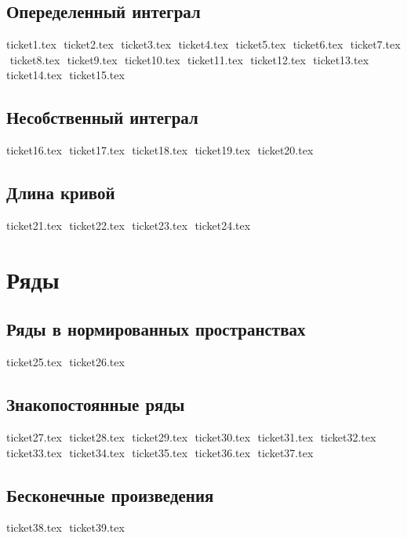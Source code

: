 \section{Опеределенный интеграл}
{ticket1.tex}
$ $
{ticket2.tex}
$ $
{ticket3.tex}
$ $
{ticket4.tex}
$ $
{ticket5.tex}
$ $
{ticket6.tex}
$ $
{ticket7.tex}
$ $
{ticket8.tex}
$ $
{ticket9.tex}
$ $
{ticket10.tex}
$ $
{ticket11.tex}
$ $
{ticket12.tex}
$ $
{ticket13.tex}
$ $
{ticket14.tex}
$ $
{ticket15.tex}
$ $
\section{Несобственный интеграл}
{ticket16.tex}
$ $
{ticket17.tex}
$ $
{ticket18.tex}
$ $
{ticket19.tex}
$ $
{ticket20.tex}
$ $

\section{Длина кривой}
{ticket21.tex}
$ $
{ticket22.tex}
$ $
{ticket23.tex}
$ $
{ticket24.tex}
$ $

\chapter{Ряды}
\section{Ряды в нормированных пространствах}
{ticket25.tex}
$ $
{ticket26.tex}
$ $

\section{Знакопостоянные ряды}
{ticket27.tex}
$ $
{ticket28.tex}
$ $
{ticket29.tex}
$ $
{ticket30.tex}
$ $
{ticket31.tex}
$ $
{ticket32.tex}
$ $
{ticket33.tex}
$ $
{ticket34.tex}
$ $
{ticket35.tex}
$ $
{ticket36.tex}
$ $
{ticket37.tex}
$ $

\section{Бесконечные произведения}
{ticket38.tex}
$ $
{ticket39.tex}
$ $

